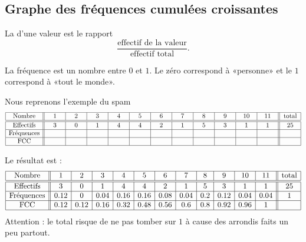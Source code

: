 \subsection{Graphe des fréquences cumulées croissantes}

\begin{definition}
    La  d'une valeur est le rapport
    \begin{equation}
        \frac{ \text{effectif de la valeur} }{ \text{effectif total} }.
    \end{equation}
\end{definition}

\begin{Aretenir}
    La fréquence est un nombre entre \( 0\) et \( 1\). Le zéro correspond à «personne» et le \( 1\) correspond à «tout le monde».
\end{Aretenir}

Nous reprenons l'exemple du spam
\begin{equation*}
    \begin{array}[]{|c||c|c|c|c|c|c|c|c|c|c|c|| c |}
        \hline
        \text{Nombre}&1&2&3&4&5&6&7&8&9&10&11&\text{total}\\
        \hline\hline
        \text{Effectifs}&3&0&1&4&4&2&1&5&3&1&1&25\\
        \hline
        \text{Fréquences}&\hphantom{0.001}&\hphantom{0.001}&\hphantom{0.001}&\hphantom{0.001}&\hphantom{0.001}&\hphantom{0.001}&\hphantom{0.001}&\hphantom{0.001}&\hphantom{0.001}&\hphantom{0.001}&\hphantom{0.001}&\hphantom{0.001}\\
        \hline
        \text{FCC}&&&&&&&&&&&&\\
        \hline
    \end{array}
\end{equation*}

Le résultat est :
\begin{equation*}
    \begin{array}[]{|c||c|c|c|c|c|c|c|c|c|c|c|| c |}
        \hline
        \text{Nombre}&1&2&3&4&5&6&7&8&9&10&11&\text{total}\\
        \hline\hline
        \text{Effectifs}&3&0&1&4&4&2&1&5&3&1&1&25\\
        \hline
        \text{Fréquences}&0.12&0&0.04&0.16&0.16&0.08&0.04&0.2&0.12&0.04&0.04&1\\
        \hline
        \text{FCC}&0.12&0.12&0.16&0.32&0.48&0.56&0.6&0.8&0.92&0.96&1&\\
        \hline
    \end{array}
\end{equation*}
Attention : le total risque de ne pas tomber sur \( 1\) à cause des arrondis faits un peu partout.


